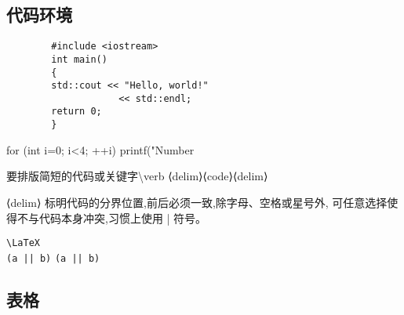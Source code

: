 \documentclass[a4paper]{ctexart}
\begin{document}
    \subsection{代码环境}
    \begin{verbatim}
        #include <iostream>
        int main() 
        {
        std::cout << "Hello, world!"
                    << std::endl;
        return 0;
        }
    \end{verbatim}
    \begin{verbatim*}
        for (int i=0; i<4; ++i)
        printf("Number %d\n",i);
    \end{verbatim*}
    要排版简短的代码或关键字\textbackslash verb ⟨delim⟩⟨code⟩⟨delim⟩\par
    ⟨delim⟩ 标明代码的分界位置,前后必须一致,除字母、空格或星号外,%
    可任意选择使得不与代码本身冲突,习惯上使用 | 符号。\par
    \verb|\LaTeX| \\ 
    \verb+(a || b)+ \verb*+(a || b)+    
    \subsection{表格}
\end{document}
